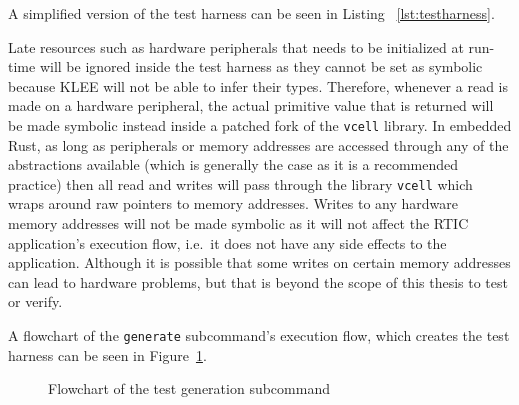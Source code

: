 A simplified version of the test harness can be seen in Listing
~\ref{lst:testharness}.



Late resources such as hardware peripherals that needs to be initialized at
run-time will be ignored inside the test harness as they cannot be set as
symbolic because KLEE will not be able to infer their types. Therefore, whenever
a read is made on a hardware peripheral, the actual primitive value that is
returned will be made symbolic instead inside a patched fork of the
\texttt{vcell} library. In embedded Rust, as long as peripherals or memory
addresses are accessed through any of the abstractions available (which is
generally the case as it is a recommended practice) then all read and writes will pass
through the library \texttt{vcell} which wraps around raw pointers to memory
addresses. Writes to any hardware memory addresses will not be made symbolic as
it will not affect the RTIC application's execution flow, i.e.\ it does not
have any side effects to the application. Although it is possible that some
writes on certain memory addresses can lead to hardware problems, but that is
beyond the scope of this thesis to test or verify.

A flowchart of the \texttt{generate} subcommand's execution flow, which creates
the test harness can be seen in Figure~\ref{fig:generatecmd}.
\begin{figure}[H]
    \centering
    \caption{Flowchart of the test generation subcommand}
    \label{fig:generatecmd}
\end{figure}

